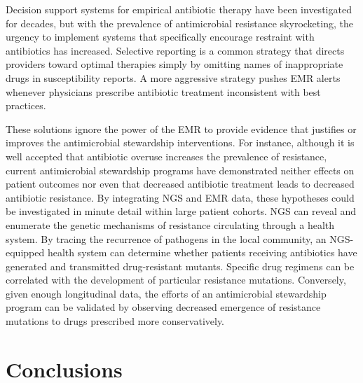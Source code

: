 Decision support systems for empirical antibiotic therapy have been investigated for decades,\autocite{Leibovici1997} but with the prevalence of antimicrobial resistance skyrocketing, the urgency to implement systems that specifically encourage restraint with antibiotics has increased.\autocite{Wagner2014} Selective reporting is a common strategy that directs providers toward optimal therapies simply by omitting names of inappropriate drugs in susceptibility reports.\autocite{Doern2013} A more aggressive strategy pushes EMR alerts whenever physicians prescribe antibiotic treatment inconsistent with best practices.\autocite{Kullar2013}

These solutions ignore the power of the EMR to provide evidence that justifies or improves the antimicrobial stewardship interventions. For instance, although it is well accepted that antibiotic overuse increases the prevalence of resistance, current antimicrobial stewardship programs have demonstrated neither effects on patient outcomes nor even that decreased antibiotic treatment leads to decreased antibiotic resistance.\autocite{Wagner2014} By integrating NGS and EMR data, these hypotheses could be investigated in minute detail within large patient cohorts. NGS can reveal and enumerate the genetic mechanisms of resistance circulating through a health system. By tracing the recurrence of pathogens in the local community, an NGS-equipped health system can determine whether patients receiving antibiotics have generated and transmitted drug-resistant mutants. Specific drug regimens can be correlated with the development of particular resistance mutations. Conversely, given enough longitudinal data, the efforts of an antimicrobial stewardship program can be validated by observing decreased emergence of resistance mutations to drugs prescribed more conservatively.

\section{Conclusions}

